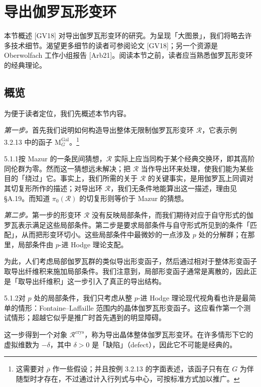 \section{导出伽罗瓦形变环}

本节概述 [GV18] 对导出伽罗瓦形变环的研究。为呈现「大图景」，我们将略去许多技术细节。渴望更多细节的读者可参阅论文 [GV18]；另一个资源是 Oberwolfach 工作小组报告 [Arb21]。阅读本节之前，读者应当熟悉伽罗瓦形变环的经典理论。

\subsection{概览}

为便于读者定位，我们先概述本节内容。

\emph{第一步。}首先我们说明如何构造导出整体无限制伽罗瓦形变环 $\mathcal R$，它表示例 3.2.13 中的函子 $\mathrm{M}^{\mathrm{Gal}}_G$。\footnote{这需要对 $\overline\rho$ 作一些假设；并且按例 3.2.13 的字面表述，该函子只有在 $G$ 为伴随型时才存在，不过通过计入行列式与中心，可按标准方式加以推广。}

\begin{rem}{5.1.1}\label{thm:a6-03-5}按 Mazur 的一条民间猜想，$\mathcal R$ 实际上应当同构于某个经典交换环，即其高阶同伦群为零。然而这一猜想远未解决；把 $\mathcal R$ 当作导出环来处理，使我们能为某些目的「绕过」它。事实上，我们所需的关于 $\mathcal R$ 的关键事实，是用伽罗瓦上同调对其切复形所作的描述；对导出环 $\mathcal R$，我们无条件地能算出这一描述，理由见 §A.19。而知道 $\pi_0(\mathcal R)$ 的切复形则等价于 Mazur 的猜想。
\end{rem}

\emph{第二步。}第一步的形变环 $\mathcal R$ 没有反映局部条件，而我们期待对应于自守形式的伽罗瓦表示满足这些局部条件。第二步是要求局部条件与自守形式所见到的条件「匹配」，从而把形变环切小。这些局部条件中最微妙的一点涉及 $p$ 处的分解群；在那里，局部条件由 $p$-进 Hodge 理论支配。

为此，人们考虑局部伽罗瓦群的类似导出形变函子，然后通过相对于整体形变函子取导出纤维积来施加局部条件。我们注意到，局部形变函子通常是离散的，因此正是「取导出纤维积」这一步引入了真正的导出结构。

\begin{rem}{5.1.2}\label{thm:a6-03-6}对 $p$ 处的局部条件，我们只考虑从整 $p$-进 Hodge 理论现代视角看也许是最简单的情形：Fontaine--Laffaille 范围内的晶体伽罗瓦形变函子。这应看作第一个测试情形；超越它似乎是推广时首先遇到的明显障碍。
\end{rem}

这一步得到一个对象 $\mathcal R^{\mathrm{crys}}$，称为导出晶体整体伽罗瓦形变环。在许多情形下它的虚拟维数为 $-\delta$，其中 $\delta>0$ 是「缺陷」（defect），因此它不可能是经典的。

